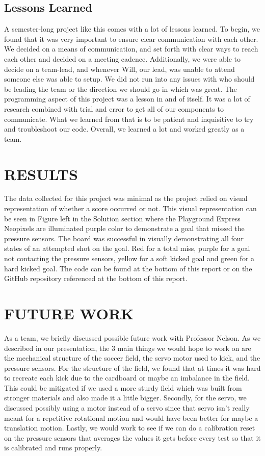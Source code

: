 \documentclass[12pt]{article}
\begin{document}
\subsection{Lessons Learned}
A semester-long project like this comes with a lot of lessons learned. To begin, we found that it was very important to ensure clear communication with each other. We decided on a means of communication, and set forth with clear ways to reach each other and decided on a meeting cadence. Additionally, we were able to decide on a team-lead, and whenever Will, our lead, was unable to attend someone else was able to setup. We did not run into any issues with who should be leading the team or the direction we should go in which was great. The programming aspect of this project was a lesson in and of itself. It was a lot of research combined with trial and error to get all of our components to communicate. What we learned from that is to be patient and inquisitive to try and troubleshoot our code. Overall, we learned a lot and worked greatly as a team.

\section{RESULTS}
The data collected for this project was minimal as the project relied on visual representation of whether a score occurred or not. This visual representation can be seen in Figure left in the Solution section where the Playground Express Neopixels are illuminated purple color to demonstrate a goal that missed the pressure sensors. The board was successful in visually demonstrating all four states of an attempted shot on the goal. Red for a total miss, purple for a goal not contacting the pressure sensors, yellow for a soft kicked goal and green for a hard kicked goal. 
The code can be found at the bottom of this report or on the GitHub repository referenced at the bottom of this report. 

\section{FUTURE WORK}
As a team, we briefly discussed possible future work with Professor Nelson. As we described in our presentation, the 3 main things we would hope to work on are the mechanical structure of the soccer field, the servo motor used to kick, and the pressure sensors. For the structure of the field, we found that at times it was hard to recreate each kick due to the cardboard or maybe an imbalance in the field. This could be mitigated if we used a more sturdy field which was built from stronger materials and also made it a little bigger. Secondly, for the servo, we discussed possibly using a motor instead of a servo since that servo isn't really meant for a repetitive rotational motion and would have been better for maybe a translation motion. Lastly, we would work to see if we can do a calibration reset on the pressure sensors that averages the values it gets before every test so that it is calibrated and runs properly. 
\end{document}
